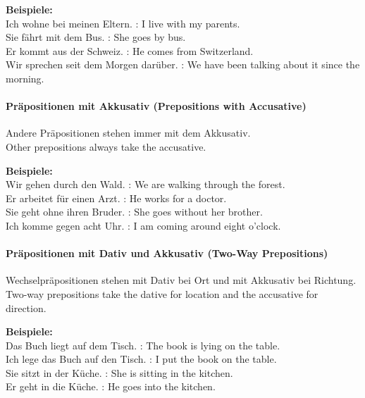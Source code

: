 \documentclass[a4paper]{article}
\begin{document}
            \textbf{Beispiele:}\\
            Ich wohne bei meinen Eltern. : I live with my parents.\\
            Sie fährt mit dem Bus. : She goes by bus.\\
            Er kommt aus der Schweiz. : He comes from Switzerland.\\
            Wir sprechen seit dem Morgen darüber. : We have been talking about it since the morning.
        
        \paragraph{Präpositionen mit Akkusativ {\small (Prepositions with Accusative)}}
            Andere Präpositionen stehen immer mit dem Akkusativ.\\
            Other prepositions always take the accusative.
            
            \textbf{Beispiele:}\\
            Wir gehen durch den Wald. : We are walking through the forest.\\
            Er arbeitet für einen Arzt. : He works for a doctor.\\
            Sie geht ohne ihren Bruder. : She goes without her brother.\\
            Ich komme gegen acht Uhr. : I am coming around eight o'clock.
        
        \paragraph{Präpositionen mit Dativ und Akkusativ {\small (Two-Way Prepositions)}}
            Wechselpräpositionen stehen mit Dativ bei Ort und mit Akkusativ bei Richtung.\\
            Two-way prepositions take the dative for location and the accusative for direction.
            
            \textbf{Beispiele:}\\
            Das Buch liegt auf dem Tisch. : The book is lying on the table.\\
            Ich lege das Buch auf den Tisch. : I put the book on the table.\\
            Sie sitzt in der Küche. : She is sitting in the kitchen.\\
            Er geht in die Küche. : He goes into the kitchen.
        
\end{document}

